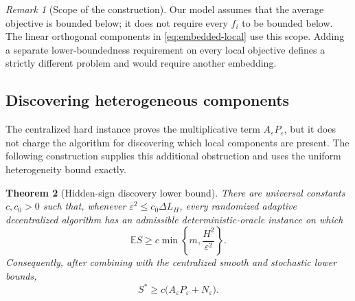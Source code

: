 \documentclass[11pt,a4paper]{article}
\newcommand{\E}{\mathbb{E}}
\newcommand{\eps}{\varepsilon}
\newtheorem{theorem}{Theorem}[section]
\theoremstyle{remark}
\newtheorem{remark}[theorem]{Remark}
\begin{document}
\begin{remark}[Scope of the construction]
Our model assumes that the average objective is bounded below; it
does not require every $f_i$ to be bounded below.  The linear orthogonal
components in \eqref{eq:embedded-local} use this scope.  Adding a
separate lower-boundedness requirement on every local objective defines a
strictly different problem and would require another embedding.
\end{remark}
\subsection{Discovering heterogeneous components}
\label{sec:discovery-lower}

The centralized hard instance proves the multiplicative term
$A_\eps P_\eps$, but it does not charge the algorithm for discovering which
local components are present.  The following construction supplies this
additional obstruction and uses the uniform heterogeneity bound exactly.

\begin{theorem}[Hidden-sign discovery lower bound]
\label{thm:discovery-lower}
There are universal constants $c,c_0>0$ such that, whenever
$\eps^2\le c_0\Delta L_H$, every randomized adaptive decentralized algorithm
has an admissible deterministic-oracle instance on which
\begin{equation}
 \E S\ge c\min\left\{m,\frac{H^2}{\eps^2}\right\}.
 \label{eq:discovery-lower}
\end{equation}
Consequently, after combining with the centralized smooth and stochastic
lower bounds,
\begin{equation}
 \boxed{
 S^*\ge c\bigl(A_\eps P_\eps+N_\eps\bigr).}
 \label{eq:combined-sample-lower}
\end{equation}
\end{theorem}
\end{document}
